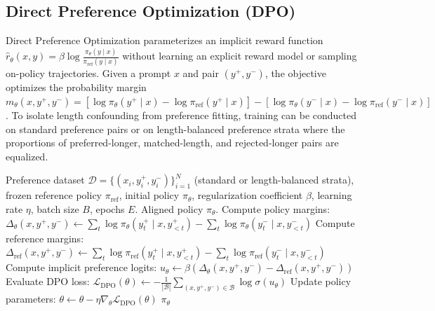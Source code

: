 \documentclass{article}
\begin{document}
\subsection{Direct Preference Optimization (DPO)}
Direct Preference Optimization parameterizes an implicit reward function $\hat{r}_\theta(x, y) = \beta \log \frac{\pi_\theta(y \mid x)}{\pi_{\text{ref}}(y \mid x)}$ without learning an explicit reward model or sampling on-policy trajectories. Given a prompt $x$ and pair $(y^+, y^-)$, the objective optimizes the probability margin $m_\theta(x, y^+, y^-) = [\log \pi_\theta(y^+ \mid x) - \log \pi_{\text{ref}}(y^+ \mid x)] - [\log \pi_\theta(y^- \mid x) - \log \pi_{\text{ref}}(y^- \mid x)]$. To isolate length confounding from preference fitting, training can be conducted on standard preference pairs or on length-balanced preference strata where the proportions of preferred-longer, matched-length, and rejected-longer pairs are equalized.

\begin{algorithm}[H]
\caption{Direct Preference Optimization (DPO) with Stratified Sampling}\label{alg:dpo}
\begin{algorithmic}[1]
\Require Preference dataset $\mathcal{D} = \{(x_i, y_i^+, y_i^-)\}_{i=1}^N$ (standard or length-balanced strata), frozen reference policy $\pi_{\text{ref}}$, initial policy $\pi_{\theta}$, regularization coefficient $\beta$, learning rate $\eta$, batch size $B$, epochs $E$.
\Ensure Aligned policy $\pi_{\theta}$.
    \State Compute policy margins: $\Delta_\theta(x, y^+, y^-) \gets \sum_{t} \log \pi_\theta(y_t^+ \mid x, y_{<t}^+) - \sum_{t} \log \pi_\theta(y_t^- \mid x, y_{<t}^-)$
    \State Compute reference margins: $\Delta_{\text{ref}}(x, y^+, y^-) \gets \sum_{t} \log \pi_{\text{ref}}(y_t^+ \mid x, y_{<t}^+) - \sum_{t} \log \pi_{\text{ref}}(y_t^- \mid x, y_{<t}^-)$
    \State Compute implicit preference logits: $u_\theta \gets \beta \left( \Delta_\theta(x, y^+, y^-) - \Delta_{\text{ref}}(x, y^+, y^-) \right)$
    \State Evaluate DPO loss: $\mathcal{L}_{\text{DPO}}(\theta) \gets - \frac{1}{|\mathcal{B}|} \sum_{(x, y^+, y^-) \in \mathcal{B}} \log \sigma(u_\theta)$
    \State Update policy parameters: $\theta \gets \theta - \eta \nabla_\theta \mathcal{L}_{\text{DPO}}(\theta)$
  \EndFor
\EndFor
\State \Return $\pi_\theta$
\end{algorithmic}
\end{algorithm}

\clearpage
\end{document}
